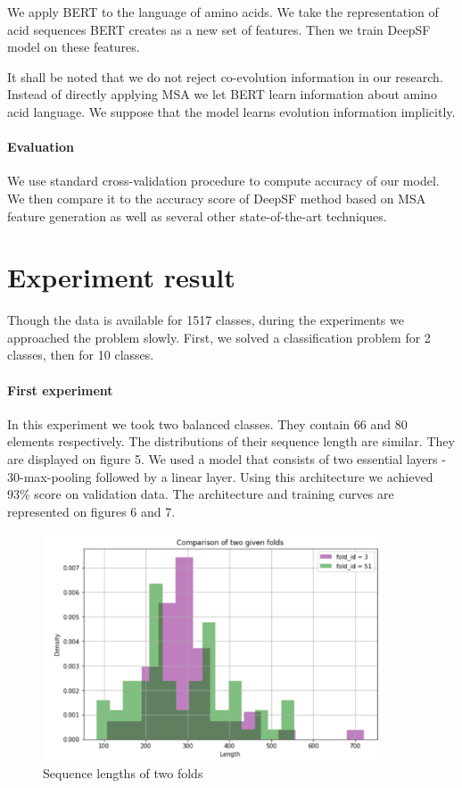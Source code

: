 \documentclass[12pt, twoside]{article}
\begin{document}
We apply BERT to the language of amino acids. We take the representation of acid sequences BERT creates as a new set of features. Then we train DeepSF model on these features.

It shall be noted that we do not reject co-evolution information in our research. Instead of directly applying MSA we let BERT learn information about amino acid language. We suppose that the model learns evolution information implicitly.

\paragraph{Evaluation}
\noindent
We use standard cross-validation procedure to compute accuracy of our model. We then compare it to the accuracy score of DeepSF method based on MSA feature generation as well as several other state-of-the-art techniques. 

\section{Experiment result}
Though the data is available for 1517 classes, during the experiments we approached the problem slowly. First, we solved a classification problem for 2 classes, then for 10 classes.

\paragraph{First experiment}
\noindent In this experiment we took two balanced classes. They contain 66 and 80 elements respectively. The distributions of their sequence length are similar. They are displayed on figure 5. We used a model that consists of two essential layers - 30-max-pooling followed by a linear layer. Using this architecture we achieved 93\% score on validation data. The architecture and training curves are represented on figures 6 and 7.  
\begin{figure}[htp]
    \centering
    \includegraphics[width=10cm]{figures/figure5.pdf}
    \caption{Sequence lengths of two folds}
\end{figure}
\end{document}
